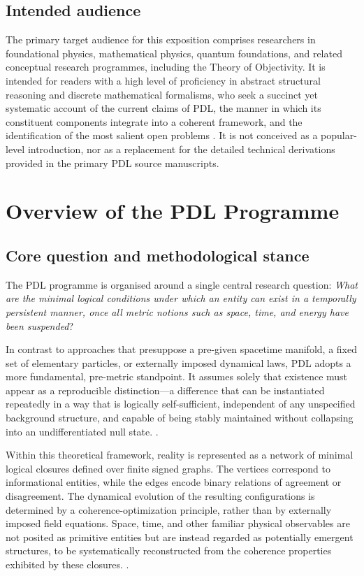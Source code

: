 \documentclass{article}
\begin{document}
\subsection{Intended audience}
\label{subsec:intended_audience}

The primary target audience for this exposition comprises researchers in foundational physics, mathematical physics, quantum foundations, and related conceptual research programmes, including the Theory of Objectivity. It is intended for readers with a high level of proficiency in abstract structural reasoning and discrete mathematical formalisms, who seek a succinct yet systematic account of the current claims of PDL, the manner in which its constituent components integrate into a coherent framework, and the identification of the most salient open problems \citep{PDL_intro,PDL_TO_dialogue,PDL_position}. It is not conceived as a popular-level introduction, nor as a replacement for the detailed technical derivations provided in the primary PDL source manuscripts.

\section{Overview of the PDL Programme}
\label{sec:overview}

\subsection{Core question and methodological stance}
\label{subsec:core_question}

The PDL programme is organised around a single central research question: \emph{What are the minimal logical conditions under which an entity can exist in a temporally persistent manner, once all metric notions such as space, time, and energy have been suspended}? \citep{PDL_Main_2026,PDL_intro}

In contrast to approaches that presuppose a pre-given spacetime manifold, a fixed set of elementary particles, or externally imposed dynamical laws, PDL adopts a more fundamental, pre-metric standpoint. It assumes solely that existence must appear as a reproducible distinction—a difference that can be instantiated repeatedly in a way that is logically self-sufficient, independent of any unspecified background structure, and capable of being stably maintained without collapsing into an undifferentiated null state.
\citep{PDL_Main_2026,PDL_position}.

Within this theoretical framework, reality is represented as a network of minimal logical closures defined over finite signed graphs. The vertices correspond to informational entities, while the edges encode binary relations of agreement or disagreement. The dynamical evolution of the resulting configurations is determined by a coherence-optimization principle, rather than by externally imposed field equations. Space, time, and other familiar physical observables are not posited as primitive entities but are instead regarded as potentially emergent structures, to be systematically reconstructed from the coherence properties exhibited by these closures.
\citep{PDL_Main_2026,PDL_intro}.
\end{document}
